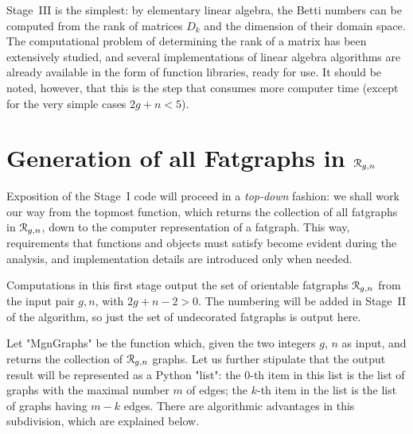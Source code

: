 Stage~III is the simplest: by elementary linear algebra, the Betti
numbers can be computed from the rank of matrices $D_k$ and the
dimension of their domain space.  The computational problem of
determining the rank of a matrix has been extensively studied, and
several implementations of linear algebra algorithms are already
available in the form of function libraries, ready for use. It should
be noted, however, that this is the step that consumes more computer
time (except for the very simple cases $2g+n<5$).


\section[Generation of fatgraphs]{Generation of all Fatgraphs in $\mathcal{R}_{g,n}$}
\label{sec:generation}

Exposition of the Stage~I code will proceed in a \emph{top-down}
fashion: we shall work our way from the topmost function, which
returns the collection of all fatgraphs in $\mathcal{R}_{g,n}$, down to the
computer representation of a fatgraph.  This way, requirements that
functions and objects must satisfy become evident during the analysis,
and implementation details are introduced only when needed.

Computations in this first stage output the set of orientable
fatgraphs $\mathcal{R}_{g,n}$ from the input pair $g, n$, with $2g +n - 2 > 0$.
The numbering will be added in Stage~II of the algorithm, so just the
set of undecorated fatgraphs is output here.

Let "MgnGraphs" be the function which, given the two integers $g$,
$n$ as input, and returns the collection of $\mathcal{R}_{g,n}$ graphs.  Let us
further stipulate that the output result will be represented as a
Python "list": the $0$-th item in this list is the list of graphs
with the maximal number $m$ of edges; the $k$-th item in the list is
the list of graphs having $m - k$ edges.  There are algorithmic
advantages in this subdivision, which are explained below.

